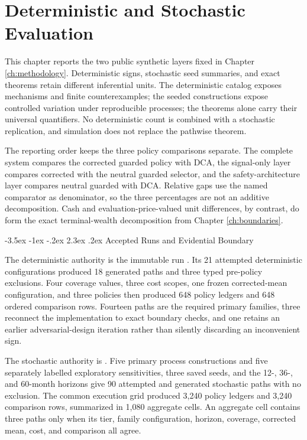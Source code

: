 \documentclass[12pt,a4paper,oneside]{report}
\makeatletter
\renewcommand\section{\@startsection{section}{1}{\z@}%
  {-3.5ex \@plus -1ex \@minus -.2ex}%
  {2.3ex \@plus .2ex}%
  {\normalfont\fontsize{14}{17}\selectfont\bfseries}}
\makeatother
\begin{document}
\chapter{Deterministic and Stochastic Evaluation}
\label{ch:synthetic-results}

This chapter reports the two public synthetic layers fixed in Chapter
\ref{ch:methodology}. Deterministic signs, stochastic seed summaries, and
exact theorems retain different inferential units. The deterministic catalog
exposes mechanisms and finite counterexamples; the seeded constructions expose
controlled variation under reproducible processes; the theorems alone carry
their universal quantifiers. No deterministic count is combined with a
stochastic replication, and simulation does not replace the pathwise theorem.

The reporting order keeps the three policy comparisons separate. The complete
system compares the corrected guarded policy with DCA, the signal-only layer
compares corrected with the neutral guarded selector, and the
safety-architecture layer compares neutral guarded with DCA. Relative gaps use
the named comparator as denominator, so the three percentages are not an
additive decomposition. Cash and evaluation-price-valued unit differences,
by contrast, do form the exact terminal-wealth decomposition from Chapter
\ref{ch:boundaries}.

\section{Accepted Runs and Evidential Boundary}
\label{sec:synthetic-evidence}

The deterministic authority is the immutable run
{\footnotesize{}}.
Its 21 attempted deterministic configurations produced 18 generated paths and
three typed pre-policy exclusions. Four coverage values, three cost scopes,
one frozen corrected-mean configuration, and three policies then produced 648
policy ledgers and 648 ordered comparison rows. Fourteen paths are the required
primary families, three reconnect the implementation to exact boundary
checks, and one retains an earlier adversarial-design iteration rather than
silently discarding an inconvenient sign.

The stochastic authority is
{\footnotesize{}}.
Five primary process constructions and five separately labelled exploratory
sensitivities, three saved seeds, and the 12-, 36-, and 60-month horizons give
90 attempted and generated stochastic paths with no exclusion. The common
execution grid produced 3,240 policy ledgers and 3,240 comparison rows,
summarized in 1,080 aggregate cells. An aggregate cell contains three paths
only when its tier, family configuration, horizon, coverage, corrected mean,
cost, and comparison all agree.
\end{document}
